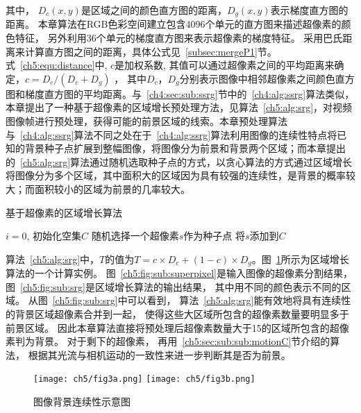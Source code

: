 其中， $D_c(x,y)$是区域之间的颜色直方图的距离，$D_g(x,y)$表示梯度直方图的距离。 本章算法在RGB色彩空间建立包含4096个单元的直方图来描述超像素的颜色特征， 另外利用36个单元的梯度直方图来表示超像素的梯度特征。 采用巴氏距离来计算直方图之间的距离，具体公式见~\ref{subsec:mergeP1}节。式~\ref{ch5:equ:distance}中, $c$是加权系数, 其值可以通过超像素之间的平均距离来确定，$c = D_c / (D_c + D_g)$  ， 其中$D_c$，$D_g$分别表示图像中相邻超像素之间颜色直方图和梯度直方图的平均距离。与~\ref{ch4:sec:sub:ssrg}节中的~\ref{ch4:alg:ssrg}算法类似，本章提出了一种基于超像素的区域增长预处理方法，见算法~\ref{ch5:alg:srg}，对视频图像帧进行预处理，获得可能的前景区域的线索。本章预处理算法与~\ref{ch4:alg:ssrg}算法不同之处在于~\ref{ch4:alg:ssrg}算法利用图像的连续性特点将已知的背景种子点扩展到整幅图像，将图像分为前景和背景两个区域；而本章提出的~\ref{ch5:alg:srg}算法通过随机选取种子点的方式，以贪心算法的方式通过区域增长将图像分为多个区域，其中面积大的区域因为具有较强的连续性，是背景的概率较大；而面积较小的区域为前景的几率较大。
\renewcommand{\algorithmcfname}{算法}
\begin{algorithm}[ht]
\caption{基于超像素的区域增长算法}
\label{ch5:alg:srg}
\LinesNumbered
{}
  $i=0$, 初始化空集$C$ \;
 随机选择一个超像素$s$作为种子点\;
 将$s$添加到$C$ \;
\end{algorithm}

算法~\ref{ch5:alg:srg}中，$T$的值为$T= c \times D_c + (1-c) \times D_g$。图~\ref{ch5:fig:srg}所示为区域增长算法的一个计算实例。 图~\ref{ch5:fig:sub:superpixel}是输入图像的超像素分割结果， 图~\ref{ch5:fig:sub:srg}是区域增长算法的输出结果， 其中用不同的颜色表示不同的区域。 从图~\ref{ch5:fig:sub:srg}中可以看到， 算法~\ref{ch5:alg:srg}能有效地将具有连续性的背景区域超像素合并到一起， 使得这些大区域所包含的超像素数量要明显多于前景区域。 因此本章算法直接将预处理后超像素数量大于15的区域所包含的超像素判为背景。 对于剩下的超像素， 再用~\ref{ch5:sec:sub:sub:motionC}节介绍的算法， 根据其光流与相机运动的一致性来进一步判断其是否为前景。
 \begin{figure}[htb]
  \centering%
    {\texttt{[image: ch5/fig3a.png]}}%
 \hspace{1em}%
      {\texttt{[image: ch5/fig3b.png]}}

  \caption{图像背景连续性示意图}\label{ch5:fig:srg}
\end{figure}


